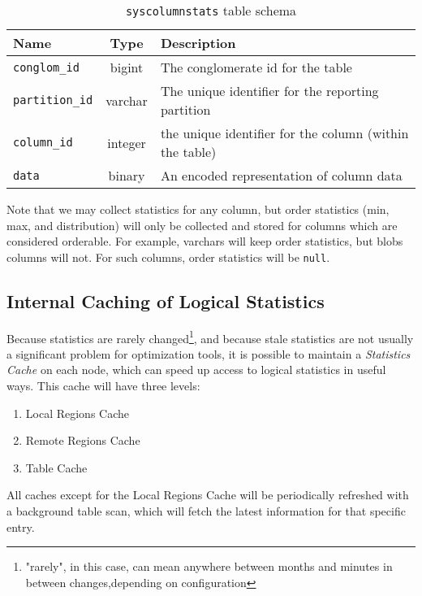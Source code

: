 \begin{table}
				\begin{tabular}{|l|c|p{6cm}|}
								\hline
								\bf{Name}									& \bf{Type}	&	\bf{Description} \\ \hline	
								\texttt{conglom\_id}			&	bigint		&	The conglomerate id for the table \\ \hline
								\texttt{partition\_id}		&	varchar		&	The unique identifier for the reporting partition \\ \hline
								\texttt{column\_id}				&	integer		&	the unique identifier for the column (within the table) \\ \hline
								\texttt{data}							&	binary		&	An encoded representation of column data \\ \hline
				\end{tabular}
				\caption{\texttt{syscolumnstats} table schema}
				\label{table:columnStats}
\end{table}

Note that we may collect statistics for any column, but order statistics (min, max, and distribution) will only be collected and stored for columns which are considered orderable. For example, varchars will keep order statistics, but blobs columns will not. For such columns, order statistics will be \texttt{null}.

\subsection{Internal Caching of Logical Statistics}
Because statistics are rarely changed\footnote{"rarely", in this case, can mean anywhere between months and minutes in between changes,depending on configuration}, and because stale statistics are not usually a significant problem for optimization tools, it is possible to maintain a \emph{Statistics Cache} on each node, which can speed up access to logical statistics in useful ways. This cache will have three levels:

\begin{enumerate}
				\item Local Regions Cache
				\item Remote Regions Cache
				\item Table Cache
\end{enumerate}

All caches except for the Local Regions Cache will be periodically refreshed with a background table scan, which will fetch the latest information for that specific entry. 

